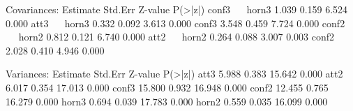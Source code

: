 \begin{Schunk}
\begin{Soutput}
Covariances:
                   Estimate  Std.Err  Z-value  P(>|z|)
  conf3 ~~                                            
    horn3             1.039    0.159    6.524    0.000
  att3 ~~                                             
    horn3             0.332    0.092    3.613    0.000
    conf3             3.548    0.459    7.724    0.000
  conf2 ~~                                            
    horn2             0.812    0.121    6.740    0.000
  att2 ~~                                             
    horn2             0.264    0.088    3.007    0.003
    conf2             2.028    0.410    4.946    0.000

Variances:
                   Estimate  Std.Err  Z-value  P(>|z|)
    att3              5.988    0.383   15.642    0.000
    att2              6.017    0.354   17.013    0.000
    conf3            15.800    0.932   16.948    0.000
    conf2            12.455    0.765   16.279    0.000
    horn3             0.694    0.039   17.783    0.000
    horn2             0.559    0.035   16.099    0.000


\end{Soutput}
\end{Schunk}
